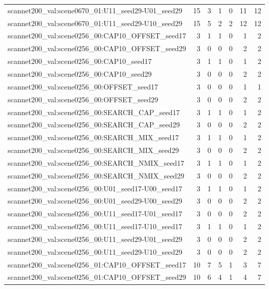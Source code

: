 \begin{table}[t]
\begin{tabular}{lrrrrrr}
scannet200\_val:scene0670\_01:U11\_seed29-U01\_seed29 & 15 & 3 & 1 & 0 & 11 & 12 \\
scannet200\_val:scene0670\_01:U11\_seed29-U10\_seed29 & 15 & 5 & 2 & 2 & 12 & 12 \\
scannet200\_val:scene0256\_00:CAP10\_OFFSET\_seed17 & 3 & 1 & 1 & 0 & 1 & 2 \\
scannet200\_val:scene0256\_00:CAP10\_OFFSET\_seed29 & 3 & 0 & 0 & 0 & 2 & 2 \\
scannet200\_val:scene0256\_00:CAP10\_seed17 & 3 & 1 & 1 & 0 & 1 & 2 \\
scannet200\_val:scene0256\_00:CAP10\_seed29 & 3 & 0 & 0 & 0 & 2 & 2 \\
scannet200\_val:scene0256\_00:OFFSET\_seed17 & 3 & 0 & 0 & 0 & 1 & 1 \\
scannet200\_val:scene0256\_00:OFFSET\_seed29 & 3 & 0 & 0 & 0 & 2 & 2 \\
scannet200\_val:scene0256\_00:SEARCH\_CAP\_seed17 & 3 & 1 & 1 & 0 & 1 & 2 \\
scannet200\_val:scene0256\_00:SEARCH\_CAP\_seed29 & 3 & 0 & 0 & 0 & 2 & 2 \\
scannet200\_val:scene0256\_00:SEARCH\_MIX\_seed17 & 3 & 1 & 1 & 0 & 1 & 2 \\
scannet200\_val:scene0256\_00:SEARCH\_MIX\_seed29 & 3 & 0 & 0 & 0 & 2 & 2 \\
scannet200\_val:scene0256\_00:SEARCH\_NMIX\_seed17 & 3 & 1 & 1 & 0 & 1 & 2 \\
scannet200\_val:scene0256\_00:SEARCH\_NMIX\_seed29 & 3 & 0 & 0 & 0 & 2 & 2 \\
scannet200\_val:scene0256\_00:U01\_seed17-U00\_seed17 & 3 & 1 & 1 & 0 & 1 & 2 \\
scannet200\_val:scene0256\_00:U01\_seed29-U00\_seed29 & 3 & 0 & 0 & 0 & 2 & 2 \\
scannet200\_val:scene0256\_00:U11\_seed17-U01\_seed17 & 3 & 0 & 0 & 0 & 2 & 2 \\
scannet200\_val:scene0256\_00:U11\_seed17-U10\_seed17 & 3 & 1 & 1 & 0 & 1 & 2 \\
scannet200\_val:scene0256\_00:U11\_seed29-U01\_seed29 & 3 & 0 & 0 & 0 & 2 & 2 \\
scannet200\_val:scene0256\_00:U11\_seed29-U10\_seed29 & 3 & 0 & 0 & 0 & 2 & 2 \\
scannet200\_val:scene0256\_01:CAP10\_OFFSET\_seed17 & 10 & 7 & 5 & 1 & 3 & 7 \\
scannet200\_val:scene0256\_01:CAP10\_OFFSET\_seed29 & 10 & 6 & 4 & 1 & 4 & 7 \\

\end{tabular}
\end{table}
